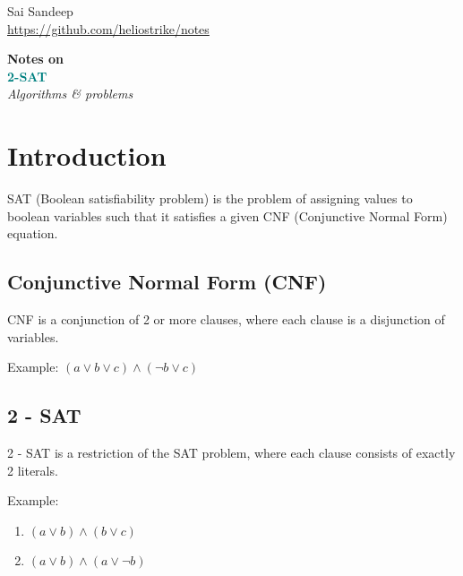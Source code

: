 \documentclass[titlepage, 12pt]{article}
\newcommand*{\logo}{\fbox{$\mathfrak{heliostriKe}$}}
\begin{document}
\begin{titlepage}

	\raggedleft

	\vspace*{\baselineskip}

	{Sai Sandeep\\\url{https://github.com/heliostrike/notes}}

	\vspace*{0.167\textheight}

	\textbf{\LARGE Notes on}\\[\baselineskip]

	\textbf{\textcolor{teal}{\huge 2-SAT}}\\[\baselineskip]

    {\Large \textit{Algorithms \& problems}}

	\vfill

	{\large \logo}

	\vspace*{3\baselineskip}

\end{titlepage}
	
	\tableofcontents
	
	\newpage
	
	\section{Introduction}
	SAT (Boolean satisfiability problem) is the problem of assigning values to boolean variables such that it satisfies a given CNF (Conjunctive Normal Form) equation.
	
	\subsection{Conjunctive Normal Form (CNF)}
	
	CNF is a conjunction of 2 or more clauses, where each clause is a disjunction of variables.
	
	Example: $ (a \lor b \lor c) \land (\lnot b \lor c) $
	
	\subsection{2 - SAT}
	
	2 - SAT is a restriction of the SAT problem, where each clause consists of exactly 2 literals.

	Example: 
	
	\begin{enumerate}
	
	\item $ (a \lor b) \land (b \lor c) $
	
	\item $ (a \lor b) \land (a \lor \lnot b) $
	
	\end{enumerate}
	
\end{document}
